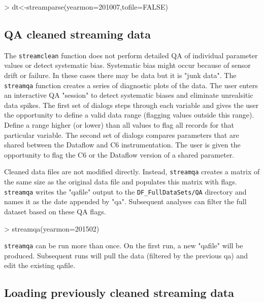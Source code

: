 \documentclass[12pt]{article}
\begin{document}
\begin{Schunk}
\begin{Sinput}
> dt<-streamparse(yearmon=201007,tofile=FALSE)
\end{Sinput}
\end{Schunk}


\subsection{QA cleaned streaming data}

The \texttt{streamclean} function does not perform detailed QA of individual parameter values or detect systematic bias. Systematic bias might occur because of sensor drift or failure. In these cases there may be data but it is "junk data". The \texttt{streamqa} function creates a series of diagnostic plots of the data. The user enters an interactive QA "session" to detect systematic biases and eliminate unrealsitic data spikes. The first set of dialogs steps through each variable and gives the user the opportunity to define a valid data range (flagging values outside this range). Define a range higher (or lower) than all values to flag all records for that particular variable. The second set of dialogs compares parameters that are shared between the Dataflow and C6 instrumentation. The user is given the opportunity to flag the C6 or the Dataflow version of a shared parameter. 

Cleaned data files are not modified directly. Instead, \texttt{streamqa} creates a matrix of the same size as the original data file and populates this matrix with flags. \texttt{streamqa} writes the "qafile" output to the \verb|DF_FullDataSets/QA| directory and names it as the date appended by "qa". Subsequent analyses can filter the full dataset based on these QA flags.

\begin{Schunk}
\begin{Sinput}
> streamqa(yearmon=201502)
\end{Sinput}
\end{Schunk}

\texttt{streamqa} can be run more than once. On the first run, a new "qafile" will be produced. Subsequent runs will pull the data (filtered by the previous qa) and edit the existing qafile.

\subsection{Loading previously cleaned streaming data}
\end{document}
